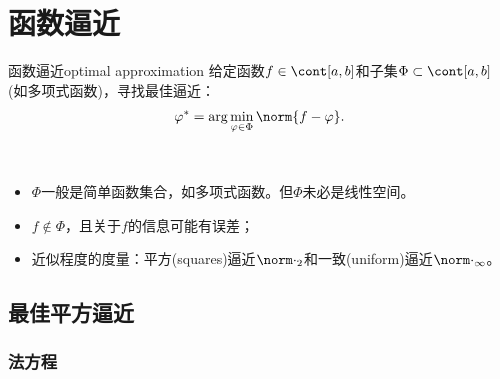 \chapter{函数逼近}
\label{chap:optimal approximation}

\begin{definition}
    {函数逼近}{optimal approximation}
    给定函数$f\in\cont[a,b]$和子集$\Phi\subset\cont[a,b]$ (如多项式函数)，寻找最佳逼近：
    \begin{equation}
        \varphi^*=\arg\min_{\varphi\in\Phi}\norm{f-\varphi}.
    \end{equation}
\end{definition}

\begin{remark}
    ~
    \begin{itemize}
        \item $\Phi$一般是简单函数集合，如多项式函数。但$\Phi$未必是线性空间。
        \item $f\notin\Phi$，且关于$f$的信息可能有误差；
        \item 近似程度的度量：平方(squares)逼近$\norm\cdot_2$和一致(uniform)逼近$\norm\cdot_\infty$。
    \end{itemize}
\end{remark}

\section{最佳平方逼近}
\label{sec:optimal squares approximation}

\subsection{法方程}

